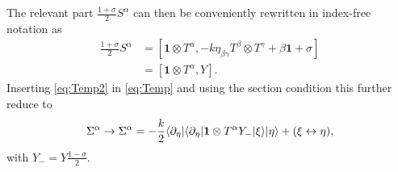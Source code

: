 The relevant part $\frac{1+\sigma}{2}S^\alpha$ can then be conveniently rewritten in index-free notation as
\begin{equation}\label{eq:Temp2}
    \begin{aligned}
        \frac{1+\sigma}{2}S^\alpha &= [\mathbf{1}\otimes T^\alpha,-k\eta_{\beta\gamma}T^\beta\otimes T^\gamma+\beta\mathbf{1}+\sigma]\\
        &= [\mathbf{1}\otimes T^\alpha,Y].
    \end{aligned}
\end{equation}
Inserting \eqref{eq:Temp2} in \eqref{eq:Temp} and using the section condition this further reduce to 
\begin{equation}
    \Sigma^\alpha \to \Sigma^\alpha = -\frac{k}{2}\langle\partial_\eta|\langle\partial_\eta |\mathbf{1}\otimes T^\alpha Y_-|\xi\rangle|\eta\rangle+(\xi\leftrightarrow\eta),
\end{equation}
with $Y_- = Y\frac{1-\sigma}{2}$. 

